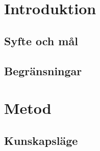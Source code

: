 \documentclass[11pt,a4paper,oneside]{book}
\begin{document}


\tableofcontents
\mainmatter

\chapter{Introduktion}


\section{Syfte och mål} %



\section{Begränsningar} %


\newpage
\chapter{Metod}
\section{Kunskapsläge}

\end{document}
